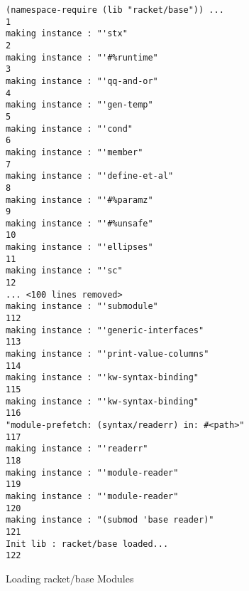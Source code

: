 \begin{figure}[!h]
  \centering
  \begin{minipage}{0.7\textwidth}
  \begin{lstlisting}[style=bashstyle]
(namespace-require (lib "racket/base")) ...                1
making instance : "'stx"                                   2
making instance : "'#%runtime"                             3
making instance : "'qq-and-or"                             4
making instance : "'gen-temp"                              5
making instance : "'cond"                                  6
making instance : "'member"                                7
making instance : "'define-et-al"                          8
making instance : "'#%paramz"                              9
making instance : "'#%unsafe"                             10
making instance : "'ellipses"                             11
making instance : "'sc"                                   12
... <100 lines removed>
making instance : "'submodule"                           112
making instance : "'generic-interfaces"                  113
making instance : "'print-value-columns"                 114
making instance : "'kw-syntax-binding"                   115
making instance : "'kw-syntax-binding"                   116
"module-prefetch: (syntax/readerr) in: #<path>"          117
making instance : "'readerr"                             118
making instance : "'module-reader"                       119
making instance : "'module-reader"                       120
making instance : "(submod 'base reader)"                121
Init lib : racket/base loaded...                         122
  \end{lstlisting}
  \end{minipage}
  \caption{Loading racket/base Modules}
  \label{fig:racket-base-loading-no-compiled}
\end{figure}
